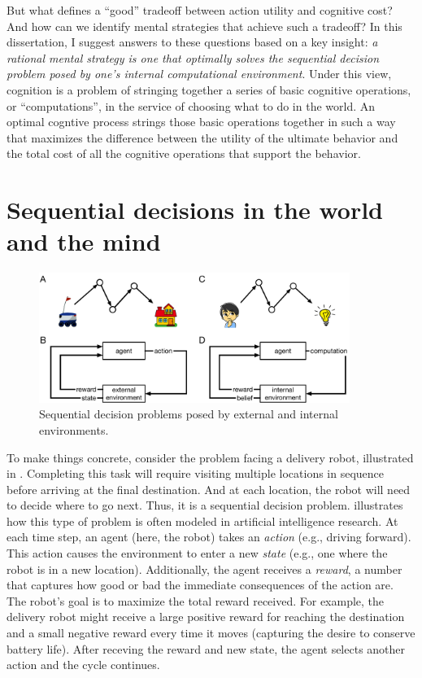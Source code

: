 But what defines a ``good'' tradeoff between action utility and cognitive cost? And how can we identify mental strategies that achieve such a tradeoff? In this dissertation, I suggest answers to these questions based on a key insight: \emph{a rational mental strategy is one that optimally solves the sequential decision problem posed by one's internal computational environment}. Under this view, cognition is a problem of stringing together a series of basic cognitive operations, or ``computations'', in the service of choosing what to do in the world. An optimal cogntive process strings those basic operations together in such a way that maximizes the difference between the utility of the ultimate behavior and the total cost of all the cognitive operations that support the behavior.


\section{Sequential decisions in the world and the mind}

\begin{figure}[t]
  \centering
  \includegraphics[width=0.9\textwidth]{diagrams/sequential-intuition.pdf}
  \caption{Sequential decision problems posed by external and internal environments.}
  \label{fig:sequential-intuition}
\end{figure}


To make things concrete, consider the problem facing a delivery robot, illustrated in . Completing this task will require visiting multiple locations in sequence before arriving at the final destination. And at each location, the robot will need to decide where to go next. Thus, it is a sequential decision problem.  illustrates how this type of problem is often modeled in artificial intelligence research. At each time step, an agent (here, the robot) takes an \emph{action} (e.g., driving forward). This action causes the environment to enter a new \emph{state} (e.g., one where the robot is in a new location). Additionally, the agent receives a \emph{reward}, a number that captures how good or bad the immediate consequences of the action are. The robot's goal is to maximize the total reward received. For example, the delivery robot might receive a large positive reward for reaching the destination and a small negative reward every time it moves (capturing the desire to conserve battery life). After receving the reward and new state, the agent selects another action and the cycle continues.

